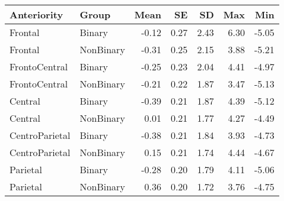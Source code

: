 \documentclass[
]{article}
\begin{document}
\begin{longtable}[]{@{}llrrrrr@{}}
\toprule()
Anteriority & Group & Mean & SE & SD & Max & Min \\
\midrule()
\endhead
Frontal & Binary & -0.12 & 0.27 & 2.43 & 6.30 & -5.05 \\
Frontal & NonBinary & -0.31 & 0.25 & 2.15 & 3.88 & -5.21 \\
FrontoCentral & Binary & -0.25 & 0.23 & 2.04 & 4.41 & -4.97 \\
FrontoCentral & NonBinary & -0.21 & 0.22 & 1.87 & 3.47 & -5.13 \\
Central & Binary & -0.39 & 0.21 & 1.87 & 4.39 & -5.12 \\
Central & NonBinary & 0.01 & 0.21 & 1.77 & 4.27 & -4.49 \\
CentroParietal & Binary & -0.38 & 0.21 & 1.84 & 3.93 & -4.73 \\
CentroParietal & NonBinary & 0.15 & 0.21 & 1.74 & 4.44 & -4.67 \\
Parietal & Binary & -0.28 & 0.20 & 1.79 & 4.11 & -5.06 \\
Parietal & NonBinary & 0.36 & 0.20 & 1.72 & 3.76 & -4.75 \\
\bottomrule()
\end{longtable}
\end{document}

